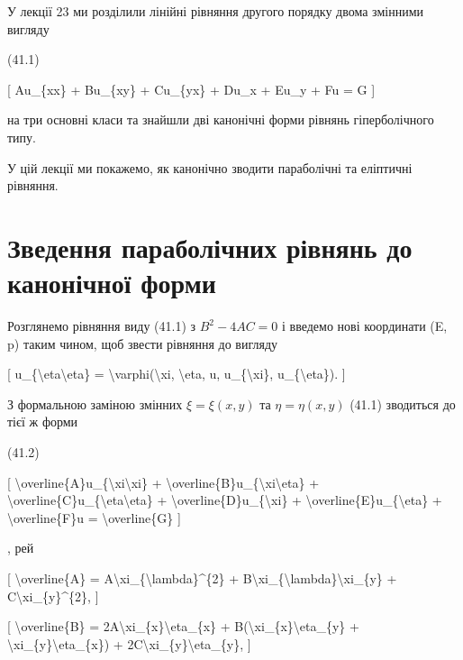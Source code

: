 \documentclass[
]{article}
\begin{document}
У лекції 23 ми розділили лінійні рівняння другого порядку двома змінними
вигляду

(41.1)

{[} Au\_\{xx\} + Bu\_\{xy\} + Cu\_\{yx\} + Du\_x + Eu\_y + Fu = G {]}

на три основні класи та знайшли дві канонічні форми рівнянь
гіперболічного типу.

У цій лекції ми покажемо, як канонічно зводити параболічні та еліптичні
рівняння.

\section{Зведення параболічних рівнянь до канонічної
форми}\label{ux437ux432ux435ux434ux435ux43dux43dux44f-ux43fux430ux440ux430ux431ux43eux43bux456ux447ux43dux438ux445-ux440ux456ux432ux43dux44fux43dux44c-ux434ux43e-ux43aux430ux43dux43eux43dux456ux447ux43dux43eux457-ux444ux43eux440ux43cux438}

Розглянемо рівняння виду (41.1) з \(B^2 - 4AC = 0\) і введемо нові
координати (E, p) таким чином, щоб звести рівняння до вигляду

{[} u\_\{\textbackslash eta\textbackslash eta\} =
\textbackslash varphi(\textbackslash xi, \textbackslash eta, u,
u\_\{\textbackslash xi\}, u\_\{\textbackslash eta\}). {]}

З формальною заміною змінних \(\xi = \xi(x, y)\) та
\(\eta = \eta(x, y)\) (41.1) зводиться до тієї ж форми

(41.2)

{[}
\textbackslash overline\{A\}u\_\{\textbackslash xi\textbackslash xi\} +
\textbackslash overline\{B\}u\_\{\textbackslash xi\textbackslash eta\} +
\textbackslash overline\{C\}u\_\{\textbackslash eta\textbackslash eta\}
+ \textbackslash overline\{D\}u\_\{\textbackslash xi\} +
\textbackslash overline\{E\}u\_\{\textbackslash eta\} +
\textbackslash overline\{F\}u = \textbackslash overline\{G\} {]}

, рей

{[} \textbackslash overline\{A\} =
A\textbackslash xi\_\{\textbackslash lambda\}\^{}\{2\} +
B\textbackslash xi\_\{\textbackslash lambda\}\textbackslash xi\_\{y\} +
C\textbackslash xi\_\{y\}\^{}\{2\}, {]}

{[} \textbackslash overline\{B\} =
2A\textbackslash xi\_\{x\}\textbackslash eta\_\{x\} +
B(\textbackslash xi\_\{x\}\textbackslash eta\_\{y\} +
\textbackslash xi\_\{y\}\textbackslash eta\_\{x\}) +
2C\textbackslash xi\_\{y\}\textbackslash eta\_\{y\}, {]}
\end{document}

